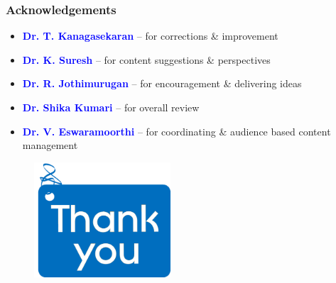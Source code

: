 \documentclass[newPxFont,sthlmFooter]{beamer}
\newcommand{\fs}{\footnotesize}
\begin{document}
\begin{frame}\frametitle{Acknowledgements}
\begin{itemize}
\fs
\item {\bf \textcolor{blue}{Dr. T. Kanagasekaran}} -- for corrections \& improvement
\item {\bf \textcolor{blue}{Dr. K. Suresh}} -- for content suggestions \& perspectives
\item {\bf \textcolor{blue}{Dr. R. Jothimurugan}} -- for encouragement \& delivering ideas
\item {\bf \textcolor{blue}{Dr. Shika Kumari}} -- for overall review
\item {\bf \textcolor{blue}{Dr. V. Eswaramoorthi}} -- for coordinating \& audience based content management
\end{itemize}
\end{frame}

\begingroup
{}
\begin{frame}
\begin{figure}
\centering
\includegraphics[width=2in]{figs/alt}
\end{figure}
\end{frame}
\endgroup
\end{document}
